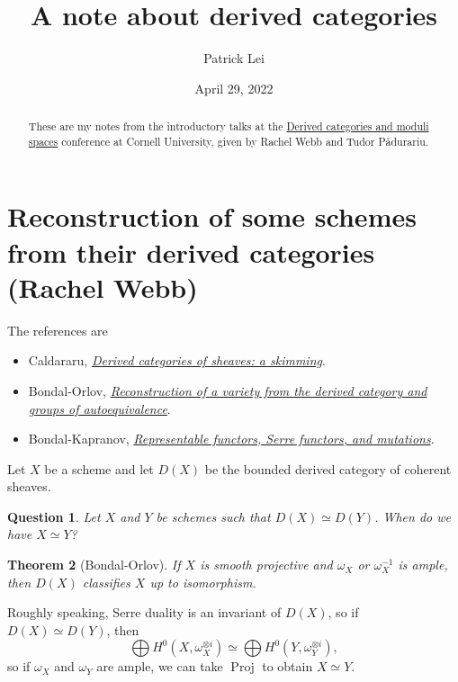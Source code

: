 \documentclass{amsart}
\title{A note about derived categories}
\author{Patrick Lei}
\date{April 29, 2022}
\newtheorem{thm}{Theorem}[section]
\newtheorem{quest}[thm]{Question}
\theoremstyle{definition}
\theoremstyle{remark}
\theoremstyle{plain}
\theoremstyle{definition}
\theoremstyle{remark}
\newcommand{\1}{\mathbf{1}}
\newcommand{\2}{\mathbf{2}}
\newcommand{\3}{\mathbf{3}}
\DeclareMathOperator{\Proj}{Proj}
\begin{document}
    
\maketitle

\begin{abstract}
    These are my notes from the introductory talks at the \href{https://sites.google.com/view/derivedfrg/events/cornell-2022}{Derived categories and moduli spaces} conference at Cornell University, given by Rachel Webb and Tudor P\v{a}durariu.
\end{abstract}

\section{Reconstruction of some schemes from their derived categories (Rachel Webb)}

The references are
\begin{itemize}
    \item Caldararu, \href{https://arxiv.org/abs/math/0501094}{\textit{Derived categories of sheaves: a skimming}}.
    \item Bondal-Orlov, \href{https://arxiv.org/abs/alg-geom/9712029}{\textit{Reconstruction of a variety from the derived category and groups of autoequivalence}}.
    \item Bondal-Kapranov, \href{http://www.mathnet.ru/php/archive.phtml?wshow=paper&jrnid=im&paperid=1153&option_lang=eng}{\textit{Representable functors, Serre functors, and mutations}}.
\end{itemize}

Let $X$ be a scheme and let $D(X)$ be the bounded derived category of coherent sheaves.

\begin{quest}
    Let $X$ and $Y$ be schemes such that $D(X) \simeq D(Y)$. When do we have $X \simeq Y$?
\end{quest}

\begin{thm}[Bondal-Orlov]
    If $X$ is smooth projective and $\omega_X$ or $\omega_X^{-1}$ is ample, then $D(X)$ classifies $X$ up to isomorphism.
\end{thm}

Roughly speaking, Serre duality is an invariant of $D(X)$, so if $D(X) \simeq D(Y)$, then
\[ \bigoplus H^0(X, \omega_X^{\otimes i}) \simeq \bigoplus H^0(Y, \omega_Y^{\otimes i}), \]
so if $\omega_X$ and $\omega_Y$ are ample, we can take $\Proj$ to obtain $X \simeq Y$.
\end{document}
